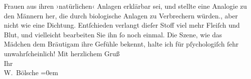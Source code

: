 \begin{ledgroupsized}[t]{13cm}
{{{                  Frauen aus ihren ›natürlichen‹ Anlagen erklärbar sei, und stellte eine Analogie zu
                  den Männern her, die durch biologische Anlagen zu Verbrechern würden.}}}\label{K_L00221-1h}, aber
               nicht wie eine Dichtung. Entſchieden verlangt dieſer Stoff viel mehr Fleiſch und
               Blut, und vielleicht bearbeiten Sie ihn ſo noch einmal. Die Szene, {\pb}wie
               das Mädchen dem Bräutigam ihre Gefühle bekennt, halte ich für pſychologiſch ſehr
               unwahrſcheinlich!\pend
           \pstart
           Mit herzlichem Gruß{\\[\baselineskip]} Ihr{\\[\baselineskip]}\spacefill\mbox{W. Bölsche}\pend
           \leftskip=0em{}
         
         \endnumbering{}\end{ledgroupsized}  \newcommand{\dateiname}{L00221}\newcommand{\titel}{Wilhelm Bölsche an Arthur Schnitzler, 12. 6. 1893}\newcommand{\editorInnen}{Martin Anton Müller und Gerd-Hermann Susen}
      